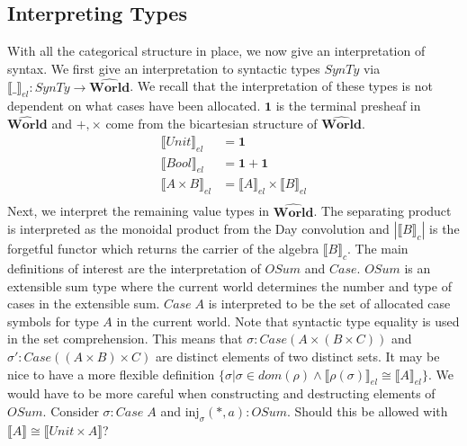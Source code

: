 \documentclass{article}
\newcommand{\injj}[2]{\textrm{inj}_{#1}#2}
\newcommand{\pworld}{\widehat{\mathbf{World}}}
\begin{document}
\subsection{Interpreting Types}
With all the categorical structure in place, we now give an interpretation of syntax. We first give an interpretation to syntactic types $SynTy$ via $\llbracket\_\rrbracket_{el} : SynTy \rightarrow \pworld$. We recall that the interpretation of these types is not dependent on what cases have been allocated. $\mathbf{1}$ is the terminal presheaf in $\pworld$ and $+,\times$ come from the bicartesian structure of $\pworld$.
\begin{align*}
    \llbracket Unit \rrbracket_{el} &= \mathbf{1}\\
    \llbracket Bool \rrbracket_{el} &= \mathbf{1}  + \mathbf{1}\\
    \llbracket A \times B \rrbracket_{el} &= \llbracket A \rrbracket_{el} \times \llbracket B \rrbracket_{el} \\
\end{align*}
Next, we interpret the remaining value types in $\pworld$. The separating product is interpreted as the monoidal product from the Day convolution and $| \llbracket B \rrbracket_c |$ is the forgetful functor which returns the carrier of the algebra $\llbracket B \rrbracket_c$. The main definitions of interest are the interpretation of $OSum$ and $Case$. $OSum$ is an extensible sum type where the current world determines the number and type of cases in the extensible sum. $Case \;A$ is interpreted to be the set of allocated case symbols for type $A$ in the current world. Note that syntactic type equality is used in the set comprehension. This means that $\sigma : Case (A \times (B \times C))$ and $\sigma' : Case((A \times B) \times C)$ are distinct elements of two distinct sets. It may be nice to have a more flexible definition $\{ \sigma | \sigma \in dom(\rho) \land \llbracket \rho(\sigma) \rrbracket_{el} \cong \llbracket A \rrbracket_{el}\}$. We would have to be more careful when constructing and destructing elements of $OSum$. Consider $\sigma : Case \;A$ and $\injj{\sigma}{(*,a)}: OSum$. Should this be allowed with $\llbracket A \rrbracket \cong \llbracket Unit \times A \rrbracket$?
\end{document}
